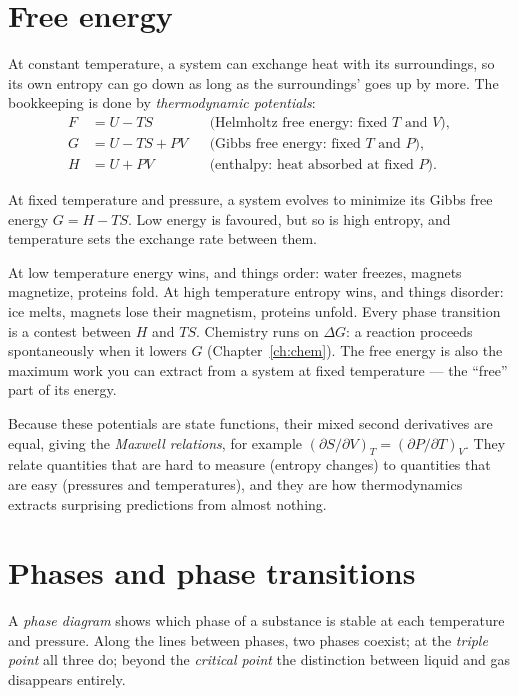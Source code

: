 \section{Free energy}

At constant temperature, a system can exchange heat with its surroundings, so its own entropy can go down as long as the surroundings' goes up by more. The bookkeeping is done by \emph{thermodynamic potentials}:
\begin{align*}
  F &= U - TS &&\text{(Helmholtz free energy: fixed $T$ and $V$)},\\
  G &= U - TS + PV &&\text{(Gibbs free energy: fixed $T$ and $P$)},\\
  H &= U + PV &&\text{(enthalpy: heat absorbed at fixed $P$)}.
\end{align*}
\begin{keyidea}
At fixed temperature and pressure, a system evolves to minimize its Gibbs free energy $G = H - TS$. Low energy is favoured, but so is high entropy, and temperature sets the exchange rate between them.
\end{keyidea}
At low temperature energy wins, and things order: water freezes, magnets magnetize, proteins fold. At high temperature entropy wins, and things disorder: ice melts, magnets lose their magnetism, proteins unfold. Every phase transition is a contest between $H$ and $TS$. Chemistry runs on $\Delta G$: a reaction proceeds spontaneously when it lowers $G$ (Chapter~\ref{ch:chem}). The free energy is also the maximum work you can extract from a system at fixed temperature --- the ``free'' part of its energy.

Because these potentials are state functions, their mixed second derivatives are equal, giving the \emph{Maxwell relations}, for example $(\partial S/\partial V)_T = (\partial P/\partial T)_V$. They relate quantities that are hard to measure (entropy changes) to quantities that are easy (pressures and temperatures), and they are how thermodynamics extracts surprising predictions from almost nothing.

\section{Phases and phase transitions}

A \emph{phase diagram} shows which phase of a substance is stable at each temperature and pressure. Along the lines between phases, two phases coexist; at the \emph{triple point} all three do; beyond the \emph{critical point} the distinction between liquid and gas disappears entirely.

